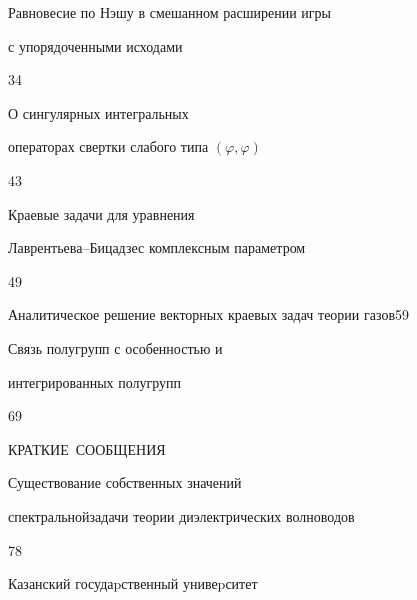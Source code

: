 

{Равновесие по Нэшу в смешанном расширении игры \newline


с упорядоченными исходами}{34}




{О сингулярных интегральных 


операторах свертки слабого типа $(\varphi,\varphi)$}{43}




{Краевые задачи для уравнения 


Лаврентьева--Бицадзе\newline с комплексным параметром}{49}




{Аналитическое решение векторных краевых задач теории газов}{59}




{Связь полугрупп с особенностью и


интегрированных полугрупп}{69}














\bigskip


\par


\centerline{КРАТКИЕ~СООБЩЕНИЯ}


\bigskip







{Существование собственных значений 


спектральной\newline задачи теории диэлектрических волноводов}{78}











\vfill


\noindent\raisebox{2pt}{\copyright} Казанский госудаpственный унивеpситет





